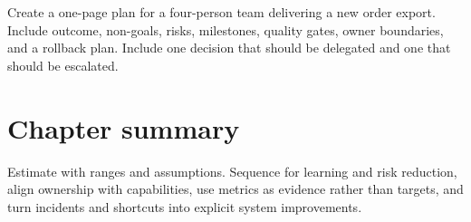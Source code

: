 \begin{exercise}
Create a one-page plan for a four-person team delivering a new order export.
Include outcome, non-goals, risks, milestones, quality gates, owner boundaries,
and a rollback plan. Include one decision that should be delegated and one that
should be escalated.
\end{exercise}

\section{Chapter summary}
Estimate with ranges and assumptions. Sequence for learning and risk reduction,
align ownership with capabilities, use metrics as evidence rather than targets,
and turn incidents and shortcuts into explicit system improvements.

